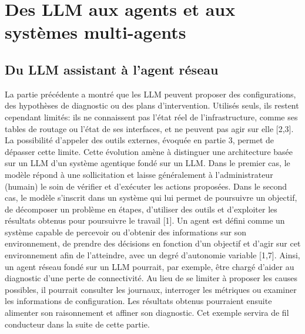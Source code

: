 \chapter{Des LLM aux agents et aux systèmes multi-agents}
\label{chap:partie-3}

\section{Du LLM assistant à l’agent réseau}
La partie précédente a montré que les LLM peuvent proposer des configurations, des hypothèses de diagnostic ou des plans d'intervention. Utilisés seuls, ils restent cependant limités: ils ne connaissent pas l'état réel de l'infrastructure, comme ses tables de routage ou l'état de ses interfaces, et ne peuvent pas agir sur elle [2,3]. La possibilité d'appeler des outils externes, évoquée en partie 3, permet de dépasser cette limite.
Cette évolution amène à distinguer une architecture basée sur un LLM d'un système agentique fondé sur un LLM. Dans le premier cas, le modèle répond à une sollicitation et laisse généralement à l'administrateur (humain) le soin de vérifier et d'exécuter les actions proposées. Dans le second cas, le modèle s'inscrit dans un système qui lui permet de poursuivre un objectif, de décomposer un problème en étapes, d'utiliser des outils et d'exploiter les résultats obtenus pour poursuivre le travail [1].
Un agent est défini comme un système capable de percevoir ou d'obtenir des informations sur son environnement, de prendre des décisions en fonction d'un objectif et d'agir sur cet environnement afin de l'atteindre, avec un degré d'autonomie variable [1,7]. Ainsi, un agent réseau fondé sur un LLM pourrait, par exemple, être chargé d'aider au diagnostic d'une perte de connectivité. Au lieu de se limiter à proposer les causes possibles, il pourrait consulter les journaux, interroger les métriques ou examiner les informations de configuration. Les résultats obtenus pourraient ensuite alimenter son raisonnement et affiner son diagnostic. Cet exemple servira de fil conducteur dans la suite de cette partie.


